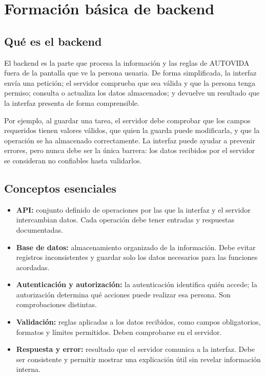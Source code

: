 \section{Formación básica de backend}

\subsection{Qué es el backend}
El backend es la parte que procesa la información y las reglas de AUTOVIDA fuera de la pantalla que ve la persona usuaria. De forma simplificada, la interfaz envía una petición; el servidor comprueba que sea válida y que la persona tenga permiso; consulta o actualiza los datos almacenados; y devuelve un resultado que la interfaz presenta de forma comprensible.

Por ejemplo, al guardar una tarea, el servidor debe comprobar que los campos requeridos tienen valores válidos, que quien la guarda puede modificarla, y que la operación se ha almacenado correctamente. La interfaz puede ayudar a prevenir errores, pero nunca debe ser la única barrera: los datos recibidos por el servidor se consideran no confiables hasta validarlos.

\subsection{Conceptos esenciales}
\begin{itemize}[leftmargin=*]
  \item \textbf{API:} conjunto definido de operaciones por las que la interfaz y el servidor intercambian datos. Cada operación debe tener entradas y respuestas documentadas.
  \item \textbf{Base de datos:} almacenamiento organizado de la información. Debe evitar registros inconsistentes y guardar solo los datos necesarios para las funciones acordadas.
  \item \textbf{Autenticación y autorización:} la autenticación identifica quién accede; la autorización determina qué acciones puede realizar esa persona. Son comprobaciones distintas.
  \item \textbf{Validación:} reglas aplicadas a los datos recibidos, como campos obligatorios, formatos y límites permitidos. Deben comprobarse en el servidor.
  \item \textbf{Respuesta y error:} resultado que el servidor comunica a la interfaz. Debe ser consistente y permitir mostrar una explicación útil sin revelar información interna.
\end{itemize}


